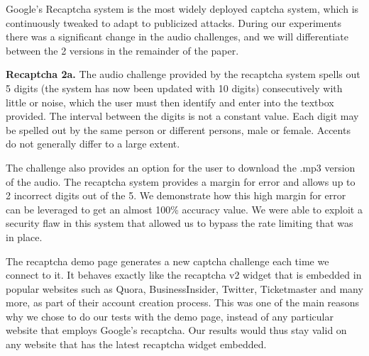 Google's Recaptcha system is the most widely deployed captcha system, which is continuously tweaked to 
adapt to publicized attacks. During our experiments there was a significant change in the audio challenges,
and we will differentiate between the 2 versions in the remainder of the paper.


\textbf{Recaptcha 2a.}
The audio challenge provided by the recaptcha system spells out 5 digits (the system has now been updated with 
10 digits) consecutively with little or noise, which the user must then identify and enter into the textbox provided. 
The interval between the digits is not a constant value. Each digit may be spelled out by the same person or different 
persons, male or female. Accents do not generally differ to a large extent.

The challenge also provides an option for the user to download the .mp3 version of the audio. The recaptcha system provides 
a margin for error and allows up to 2 incorrect digits out of the 5. We demonstrate how this high margin for error can be 
leveraged to get an almost 100\% accuracy value. We were able to exploit a security flaw in this system that allowed us to 
bypass the rate limiting that was in place.

The recaptcha demo page generates a new captcha challenge each time we connect to it. It behaves exactly like the recaptcha 
v2 widget that is embedded in popular websites such as Quora, BusinessInsider, Twitter, Ticketmaster and many more, as part 
of their account creation process. This was one of the main reasons why we chose to do our tests with the demo page, instead 
of any particular website that employs Google's recaptcha. Our results would thus stay valid on any website that has the latest 
recaptcha widget embedded.


